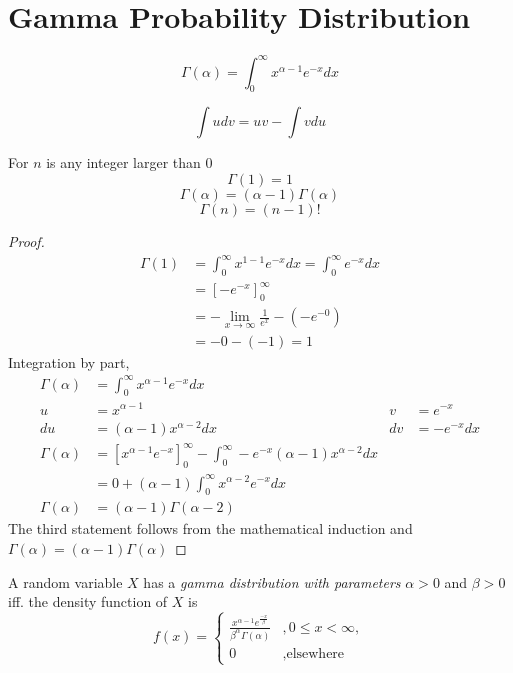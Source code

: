 \section{Gamma Probability Distribution}

\begin{definition}
    \[
    \Gamma(\alpha) = \int^\infty_0 x^{\alpha - 1} e^{-x} dx    
    \]
\end{definition}

\begin{theorem}
    \[
    \int u dv = uv - \int v du    
    \]
\end{theorem}

\begin{theorem} For $n$ is any integer larger than 0
    \[\Gamma(1) = 1 \]
    \[\Gamma(\alpha) = (\alpha -1 )\Gamma(\alpha) \]
    \[\Gamma(n) = (n-1)! \]
\end{theorem}

\begin{proof}
    \begin{align*}
        \Gamma(1) &= \int^\infty_0 x^{1 - 1} e^{-x} dx
            = \int^\infty_0 e^{-x} dx \\
            &= \left[-e^{-x}\right]^\infty_0 \\
            &= -\lim_{x \rightarrow \infty} \frac{1}{e^x}  - (-e^{-0}) \\
            &= - 0 - (- 1) = 1
    \end{align*}
    Integration by part,
    \begin{align*}
        \Gamma(\alpha) 
        &=  \int^\infty_0 x^{\alpha - 1} e^{-x} dx \\
         u  &= x^{\alpha - 1}    & v &= e^{-x} \\
         du &= (\alpha - 1)x^{\alpha - 2} dx & dv &= -e^{-x} dx \\
        \Gamma(\alpha) 
        &=  \left[x^{\alpha - 1} e^{-x} \right]^\infty_0 
            - \int^\infty_0 -e^{-x}  (\alpha - 1)x^{\alpha - 2} dx \\
        &= 0 + (\alpha - 1) \int^\infty_0 x^{\alpha - 2}  e^{-x}  dx \\
        \Gamma(\alpha)  &= (\alpha - 1)\Gamma(\alpha - 2)
    \end{align*}
    The third statement follows from the mathematical induction and  $\Gamma(\alpha) = (\alpha -1 )\Gamma(\alpha)$
\end{proof}

\begin{definition}
    A random variable $X$ has a \emph{gamma distribution with parameters} 
    $\alpha > 0$ and $\beta > 0$ iff. the density function of $X$ is
    \[
        f(x) =
        \begin{cases}
        \frac{x^{\alpha - 1}e^{\frac{-x}{\beta}}}{\beta^\alpha\Gamma(\alpha)} &, 0 \leq x < \infty,\\
        0&, \text{elsewhere}
        \end{cases} 
    \]
\end{definition}

